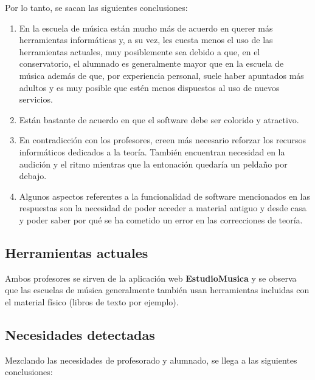 Por lo tanto, se sacan las siguientes conclusiones:

\begin{enumerate}
\item En la escuela de música están mucho más de acuerdo en querer más herramientas informáticas y, a su vez, les cuesta menos el uso de las herramientas actuales, muy posiblemente sea debido a que, en el conservatorio, el alumnado es generalmente mayor que en la escuela de música además de que, por experiencia personal, suele haber apuntados más adultos y es muy posible que estén menos dispuestos al uso de nuevos servicios.

\item Están bastante de acuerdo en que el software debe ser colorido y atractivo.

\item En contradicción con los profesores, creen más necesario reforzar los recursos informáticos dedicados a la teoría. También encuentran necesidad en la audición y el ritmo mientras que la entonación quedaría un peldaño por debajo.

\item Algunos aspectos referentes a la funcionalidad de software mencionados en las respuestas son la necesidad de poder acceder a material antiguo y desde casa y poder saber por qué se ha cometido un error en las correcciones de teoría.
\end{enumerate}

\subsection {Herramientas actuales}

Ambos profesores se sirven de la aplicación web \textbf{EstudioMusica} \cite{EstudioMusicaWeb} y se observa que las escuelas de música generalmente también usan herramientas incluidas con el material físico (libros de texto por ejemplo).

\newpage

\subsection {Necesidades detectadas}

Mezclando las necesidades de profesorado y alumnado, se llega a las siguientes conclusiones:

